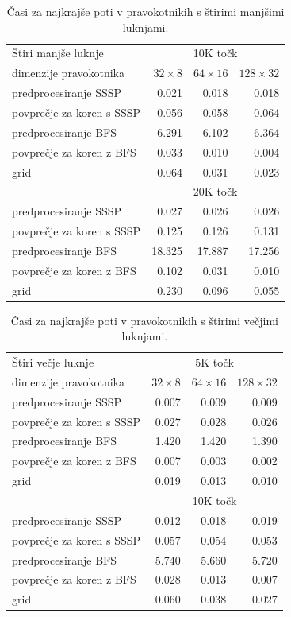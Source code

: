 \documentclass[a4paper, 12pt]{book}
\begin{document}
\begin{table}
\begin{center}
\begin{tabular}{l*{3}{r}}
Štiri manjše luknje & \multicolumn{3}{c}{10K točk} \\
dimenzije pravokotnika	&	$32\times 8$	&	$64\times 16$	&	$128\times 32$	\\						
\hline
predprocesiranje SSSP &	0.021	&	0.018	&	0.018	\\
povprečje za koren s SSSP	&	0.056	&	0.058	&	0.064	\\
predprocesiranje BFS	&	6.291	&	6.102	&	6.364	\\
povprečje za koren z BFS	&	0.033	&	0.010	&	0.004	\\
grid				&	0.064	&	0.031	&	0.023	\\
\hline
& \multicolumn{3}{c}{20K točk} \\
\hline
predprocesiranje SSSP &  0.027	&	0.026	&	0.026 \\
povprečje za koren s SSSP &	0.125	&	0.126	&	0.131 \\
predprocesiranje BFS &	18.325	&	17.887	&	17.256	\\
povprečje za koren z BFS & 0.102	&	0.031	&	0.010 \\
grid &	0.230	&	0.096	&	0.055 
\end{tabular}
\caption{Časi za najkrajše poti v pravokotnikih s štirimi manjšimi luknjami.}
\label{table4}
\end{center}
\end{table}


\begin{table}
\begin{center}
\begin{tabular}{l*{3}{r}}
Štiri večje luknje & \multicolumn{3}{c}{5K točk} \\
dimenzije pravokotnika	&	$32\times 8$	&	$64\times 16$	&	$128\times 32$ \\						
\hline
predprocesiranje SSSP	&	0.007	&	0.009	&	0.009	\\
povprečje za koren s SSSP	&	0.027	&	0.028	&	0.026	\\
predprocesiranje BFS	&	1.420	&	1.420	&	1.390	\\
povprečje za koren z BFS	&	0.007	&	0.003	&	0.002	\\
grid				&	0.019	&	0.013	&	0.010	\\
\hline
& \multicolumn{3}{c}{10K točk} \\
\hline
predprocesiranje SSSP &	0.012	&	0.018	&	0.019	\\
povprečje za koren s SSSP &	0.057	&	0.054	&	0.053	\\
predprocesiranje BFS &	5.740	&	5.660	&	5.720	\\
povprečje za koren z BFS &	0.028	&	0.013	&	0.007	\\
grid &	0.060	&	0.038	&	0.027 
\end{tabular}
\caption{Časi za najkrajše poti v pravokotnikih s štirimi večjimi luknjami.}
\label{table5}
\end{center}
\end{table}
\end{document}

